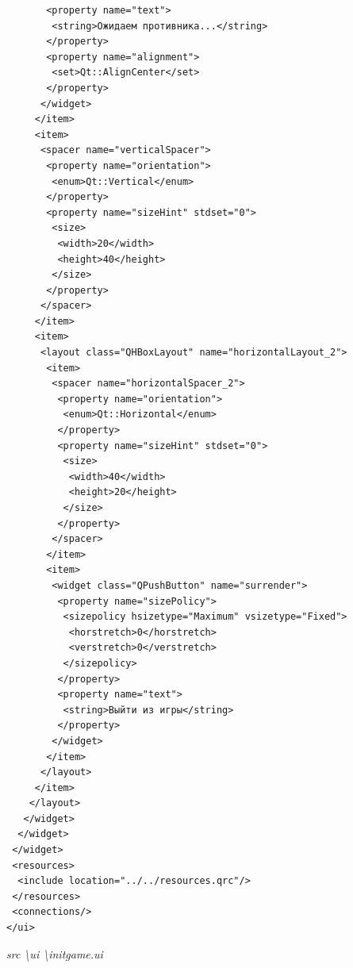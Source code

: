 \documentclass[a4paper,14pt]{extarticle}
\begin{document}
\begin{verbatim}
       <property name="text">
        <string>Ожидаем противника...</string>
       </property>
       <property name="alignment">
        <set>Qt::AlignCenter</set>
       </property>
      </widget>
     </item>
     <item>
      <spacer name="verticalSpacer">
       <property name="orientation">
        <enum>Qt::Vertical</enum>
       </property>
       <property name="sizeHint" stdset="0">
        <size>
         <width>20</width>
         <height>40</height>
        </size>
       </property>
      </spacer>
     </item>
     <item>
      <layout class="QHBoxLayout" name="horizontalLayout_2">
       <item>
        <spacer name="horizontalSpacer_2">
         <property name="orientation">
          <enum>Qt::Horizontal</enum>
         </property>
         <property name="sizeHint" stdset="0">
          <size>
           <width>40</width>
           <height>20</height>
          </size>
         </property>
        </spacer>
       </item>
       <item>
        <widget class="QPushButton" name="surrender">
         <property name="sizePolicy">
          <sizepolicy hsizetype="Maximum" vsizetype="Fixed">
           <horstretch>0</horstretch>
           <verstretch>0</verstretch>
          </sizepolicy>
         </property>
         <property name="text">
          <string>Выйти из игры</string>
         </property>
        </widget>
       </item>
      </layout>
     </item>
    </layout>
   </widget>
  </widget>
 </widget>
 <resources>
  <include location="../../resources.qrc"/>
 </resources>
 <connections/>
</ui>

\end{verbatim}
\textit{src \textbackslash ui \textbackslash initgame.ui}
\end{document}
